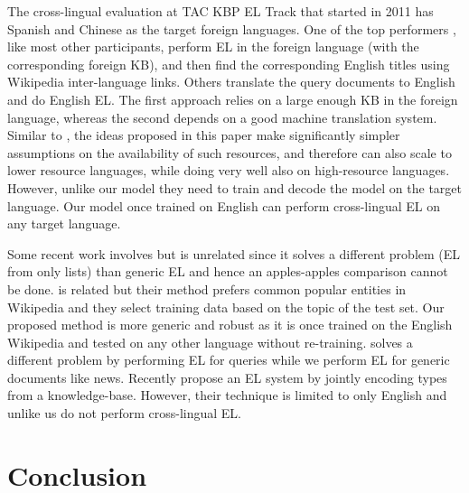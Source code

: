 \documentclass[letterpaper]{article} \usepackage{aaai18}  \usepackage{times}  \usepackage{helvet}  \usepackage{courier}  \usepackage{url}  \usepackage{graphicx}  \frenchspacing  \setlength{\pdfpagewidth}{8.5in}  \setlength{\pdfpageheight}{11in}  \usepackage{latexsym}
\begin{document}
The cross-lingual evaluation at TAC KBP EL Track that started in 2011 \cite{jioverview2011,ji2015overview} has Spanish and Chinese as the 
target foreign languages. One of the top performers \cite{sil2016one}, like most other participants, perform EL in the foreign language (with the corresponding foreign KB), and then find the corresponding English titles using Wikipedia inter-language links. Others \cite{2011cross} translate the query documents to English and do English EL. The first approach relies on a large enough KB in the foreign language, whereas the second depends on a good machine translation system. Similar to \cite{tsai2016cross}, the ideas proposed in this paper make significantly simpler assumptions on the availability of such resources, and therefore can also scale to lower resource languages, while doing very well also on high-resource languages. However, unlike our model they need to train and decode the model on the target language. Our model once trained on English can perform cross-lingual EL on any target language.

Some recent work involves \cite{lin2017list} but is unrelated since it solves a different problem (EL from only lists) than generic EL and hence an apples-apples comparison cannot be done. \cite{pan2017cross} is related but their method prefers common popular entities in Wikipedia and they select training data based on the topic of the test set. Our proposed method is more generic and robust as it is once trained on the English Wikipedia and tested on any other language without re-training. \cite{tan2017entity} solves a different problem by performing EL for queries while we perform EL for generic documents like news. Recently \cite{gupta2017entity} propose an EL system by jointly encoding types from a knowledge-base. However, their technique is limited to only English and unlike us do not perform cross-lingual EL. 






 
\section{Conclusion}
\end{document}
